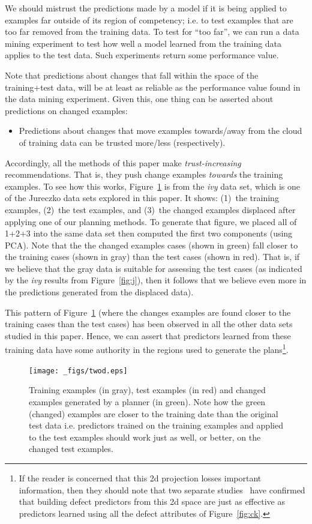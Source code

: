 \documentclass{sig-alternate}
\newcommand{\bi}{\begin{itemize}}
\newcommand{\ei}{\end{itemize}}
\newcommand{\fig}[1]{Figure~\ref{fig:#1}}
\begin{document}
We should mistrust the predictions made by a  model   if it is being applied to examples far outside of its region of competency;
i.e. to test examples that are too far removed from the training data.   
To test for ``too far'', we can run a data mining experiment to test how well
a model learned from the training data applies to the test data. Such experiments return some performance value.

Note that predictions  about changes that  fall within the space of the training+test data, will be at least
as reliable as the performance value found in the data mining experiment.
Given this, one thing  can be asserted about predictions on changed examples:
\bi
\item Predictions about changes that move examples towards/away from the cloud of training data can be trusted more/less (respectively).
\ei  
Accordingly, all the methods of this paper make {\em trust-increasing} recommendations. That is, they push change examples {\em towards} the
training examples.  To see how this works, 
 \fig{howxy} is from the {\em ivy} data
set, which is one of the Jureczko data sets explored in this paper. It shows: (1)~the training examples, (2)~the test examples, and (3)~the
changed  examples displaced after applying one of our planning methods.
To generate that figure, we placed all of 1+2+3 into the same data set then computed the first
two  components (using PCA). Note that the  the   changed examples
cases  (shown in green)  fall closer to the training cases (shown in gray) than
the test cases (shown in red).  That is, if we believe
that the gray data is  suitable for assessing
the test cases (as indicated by the {\em ivy} results from \fig{j}), then it follows
that we believe even more in the predictions
generated from the displaced data).



This pattern of \fig{howxy} (where the changes examples are found closer to  the training cases than the test cases) has been observed in all the other data sets studied in this
paper. Hence,  we can assert that
predictors learned from these training data have some authority in the regions
used to generate the plans\footnote{If the reader is concerned that this 2d projection
losses important information, then they should note that two separate  studies~\cite{papa13,divya15}
have confirmed that building defect predictors from this 2d space are just as effective
as predictors learned using all the defect attributes of \fig{ck}.}. 


\begin{figure}[!t]
  \texttt{[image: \_figs/twod.eps]} 
\caption{Training examples (in gray), test examples (in red) and 
changed examples generated by a planner (in green). Note how the green (changed) examples are closer to the  training
date than the original test data
i.e. predictors trained on the training examples and
applied to the test examples should
work just as well, or better, on the changed test examples.}\label{fig:howxy}
\end{figure}
\end{document}
